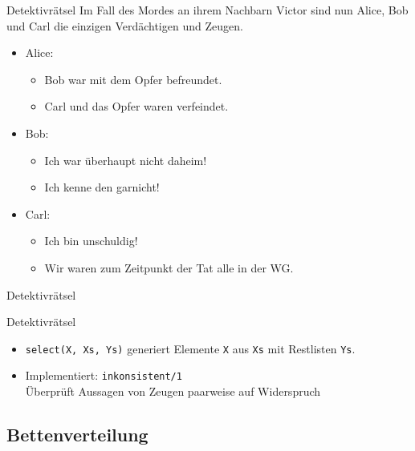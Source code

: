 \documentclass{beamer}
\begin{document}
\begin{frame}{Detektivrätsel}
	Im Fall des Mordes an ihrem Nachbarn Victor sind nun Alice, Bob und Carl die einzigen Verdächtigen und Zeugen.
	\begin{itemize}
		\item Alice:
		\begin{itemize}
			\item Bob war mit dem Opfer befreundet.
			\item Carl und das Opfer waren verfeindet.
		\end{itemize}
		\item Bob:
		\begin{itemize}
			\item Ich war überhaupt nicht daheim!
			\item Ich kenne den garnicht!
		\end{itemize}
		\item Carl:
		\begin{itemize}
			\item Ich bin unschuldig!
			\item Wir waren zum Zeitpunkt der Tat alle in der WG.
		\end{itemize}
	\end{itemize}
\end{frame}

\begin{frame}{Detektivrätsel}
\end{frame}

\begin{frame}{Detektivrätsel}
	
	\begin{itemize}
            \item \texttt{select(X, Xs, Ys)} generiert Elemente \texttt{X} aus \texttt{Xs} mit Restlisten \texttt{Ys}.
            \item Implementiert: \texttt{inkonsistent/1}\\
                  Überprüft Aussagen von Zeugen paarweise auf Widerspruch
	\end{itemize}
\end{frame}


\subsection{Bettenverteilung}
\end{document}

